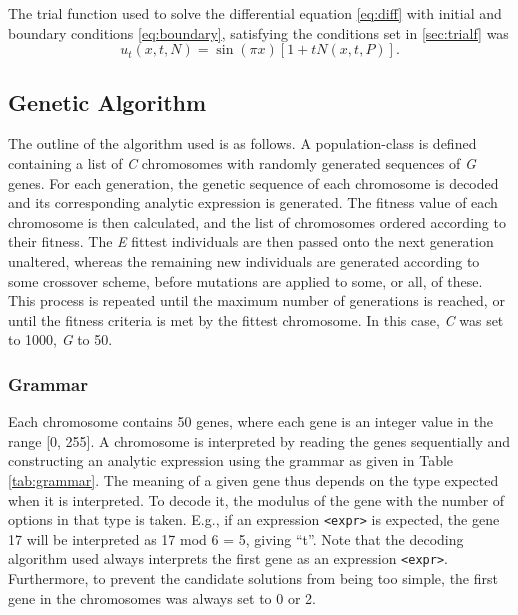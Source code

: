 \documentclass[multicolumn, 9pt]{extarticle}
\begin{document}
The trial function used to solve the differential equation \eqref{eq:diff} with initial and boundary conditions \eqref{eq:boundary}, satisfying the conditions set in \ref{sec:trialf} was
\begin{equation}
	u_t(x, t, N) = \sin{(\pi x)}[1 + tN(x, t, P)].
\end{equation}


\subsection{Genetic Algorithm}
The outline of the algorithm used is as follows. A population-class is defined containing a list of \textit{C} chromosomes with randomly generated sequences of \textit{G} genes. For each generation, the genetic sequence of each chromosome is decoded and its corresponding analytic expression is generated. The fitness value of each chromosome is then calculated, and the list of chromosomes ordered according to their fitness.
The \textit{E} fittest individuals are then passed onto the next generation unaltered, whereas the remaining new individuals are generated according to some crossover scheme, before mutations are applied to some, or all, of these.  This process is repeated until the maximum number of generations is reached, or until the fitness criteria is met by the fittest chromosome. In this case, \textit{C} was set to 1000, \textit{G} to 50.

\subsubsection{Grammar}
Each chromosome contains 50 genes, where each gene is an integer value in the range [0, 255]. A chromosome is interpreted by reading the genes sequentially and constructing an analytic expression using the grammar as given in Table \ref{tab:grammar}. The meaning of a given gene thus depends on the type expected when it is interpreted. To decode it, the modulus of the gene with the number of options in that type is taken. E.g., if an expression \texttt{<expr>} is expected, the gene 17 will be interpreted as 17 mod 6 = 5, giving ``t''. Note that the decoding algorithm used always interprets the first gene as an expression \texttt{<expr>}.  Furthermore, to prevent the candidate solutions from being too simple, the first gene in the chromosomes was always set to 0 or 2.
\end{document}
